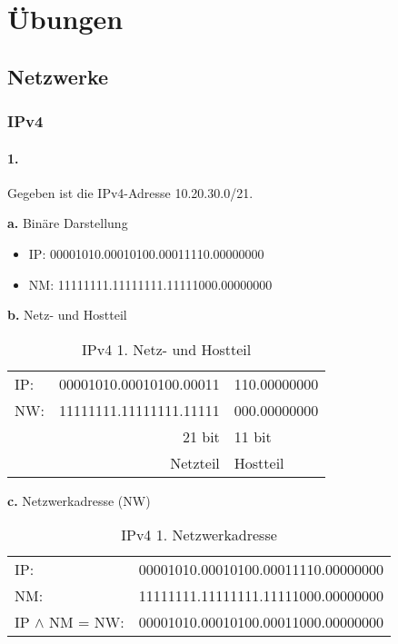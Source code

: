 \chapter{Übungen}

\section{Netzwerke}

\subsection{IPv4}

\subsubsection{1.}

Gegeben ist die IPv4-Adresse 10.20.30.0/21.

\textbf{a.} Binäre Darstellung

\begin{itemize}
    \item IP: 00001010.00010100.00011110.00000000
    \item NM: 11111111.11111111.11111000.00000000
\end{itemize}

\textbf{b.} Netz- und Hostteil

\begin{table}
    [H]
    \centering
    \begin{tabular}{lr|l}
        IP: & 00001010.00010100.00011 & 110.00000000 \\
        NW: & 11111111.11111111.11111 & 000.00000000 \\
            & 21 bit                  & 11 bit       \\
            & Netzteil                & Hostteil     \\
    \end{tabular}
    \caption{IPv4 1. Netz- und Hostteil}
\end{table}

\textbf{c.} Netzwerkadresse (NW)

\begin{table}
    [H]
    \centering
    \begin{tabular}{ll}
        IP:                 & 00001010.00010100.00011110.00000000 \\
        NM:                 & 11111111.11111111.11111000.00000000 \\
        IP $\land$ NM = NW: & 00001010.00010100.00011000.00000000 \\
    \end{tabular}
    \caption{IPv4 1. Netzwerkadresse}
\end{table}

